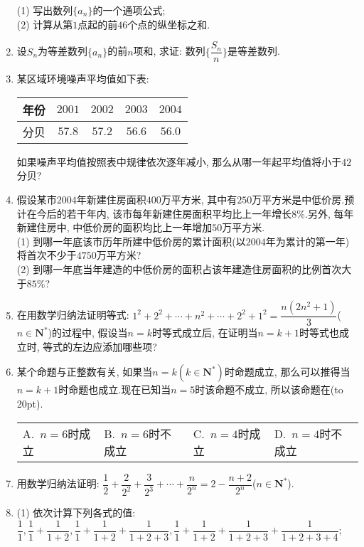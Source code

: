 \documentclass[10pt,a4paper]{article}
\newcommand{\bracket}[1]{(\hbox to #1pt{})}
\newcommand{\fourch}[4]{\par\begin{tabular}{p{.23\textwidth}p{.23\textwidth}p{.23\textwidth}p{.23\textwidth}}
A.~#1 &B.~#2& C.~#3& D.~#4
\end{tabular}}
\begin{document}
\begin{enumerate}[1.]
\begin{center}
\end{center}
(1) 写出数列$\{a_n\}$的一个通项公式;\\
(2) 计算从第$1$点起的前$46$个点的纵坐标之和.
\item 设$S_n$为等差数列$\{a_n\}$的前$n$项和, 求证: 数列$\{\dfrac{S_n}n\}$是等差数列.
\item 某区域环境噪声平均值如下表:
\begin{center}
    \begin{tabular}{|c|c|c|c|c|}
    \hline
    年份 & $2001$ & $2002$ & $2003$ & $2004$ \\ \hline
    分贝 & $57.8$ & $57.2$ & $56.6$ & $56.0$ \\ \hline
    \end{tabular}
\end{center}
如果噪声平均值按照表中规律依次逐年减小, 那么从哪一年起平均值将小于$42$分贝?
\item 假设某市$2004$年新建住房面积$400$万平方米, 其中有$250$万平方米是中低价房.预计在今后的若干年内, 该市每年新建住房面积平均比上一年增长$8\%$.另外, 每年新建住房中, 中低价房的面积均比上一年增加$50$万平方米.\\
(1) 到哪一年底该市历年所建中低价房的累计面积(以$2004$年为累计的第一年)将首次不少于$4750$万平方米?\\
(2) 到哪一年底当年建造的中低价房的面积占该年建造住房面积的比例首次大于$85\%$?
\item 在用数学归纳法证明等式: $1^2+2^2+\cdots +n^2+\cdots +2^2+1^2=\dfrac{n(2n^2+1)}3$($n\in \mathbf{N}^*$)的过程中, 假设当$n=k$时等式成立后, 在证明当$n=k+1$时等式也成立时, 等式的左边应添加哪些项?
\item 某个命题与正整数有关, 如果当$n=k(k\in \mathbf{N}^*)$时命题成立, 那么可以推得当$n=k+1$时命题也成立.现在已知当$n=5$时该命题不成立, 所以该命题在\bracket{20}.
\fourch{$n=6$时成立}{$n=6$时不成立}{$n=4$时成立}{$n=4$时不成立}
\item 用数学归纳法证明: $\dfrac 12+\dfrac 2{2^2}+\dfrac 3{2^3}+\cdots +\dfrac n{2^n}=2-\dfrac{n+2}{2^n}$($n\in \mathbf{N}^*$).
\item (1) 依次计算下列各式的值:
$\dfrac 11,\dfrac 11+\dfrac 1{1+2},\dfrac 11+\dfrac 1{1+2}+\dfrac 1{1+2+3},\dfrac 11+\dfrac 1{1+2}+\dfrac 1{1+2+3}+\dfrac 1{1+2+3+4}$;\\

\end{enumerate}
\end{document}
